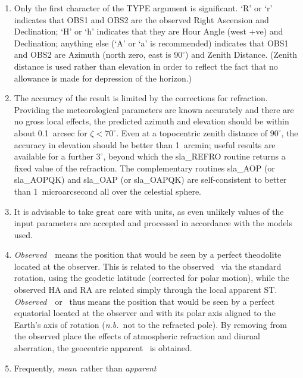 {
 \begin{enumerate}
  \item Only the first character of the TYPE argument is significant.
        `R' or `r' indicates that OBS1 and OBS2 are the observed Right
        Ascension and Declination;  `H' or `h' indicates that they are
        Hour Angle (west +ve) and Declination; anything else (`A' or
        `a' is recommended) indicates that OBS1 and OBS2 are Azimuth
        (north zero, east is $90^{\circ}$) and Zenith Distance.  (Zenith
        distance is used rather than elevation in order to reflect the
        fact that no allowance is made for depression of the horizon.)
  \item The accuracy of the result is limited by the corrections for
        refraction.  Providing the meteorological parameters are
        known accurately and there are no gross local effects, the
        predicted azimuth and elevation should be within about
        0.1~arcsec for $\zeta<70^{\circ}$.  Even
        at a topocentric zenith distance of
        $90^{\circ}$, the accuracy in elevation should be better than
        1~arcmin;  useful results are available for a further
        $3^{\circ}$, beyond which the sla\_REFRO routine returns a
        fixed value of the refraction.  The complementary
        routines sla\_AOP (or sla\_AOPQK) and sla\_OAP (or sla\_OAPQK)
        are self-consistent to better than 1~microarcsecond all over
        the celestial sphere.
  \item It is advisable to take great care with units, as even
        unlikely values of the input parameters are accepted and
        processed in accordance with the models used.
  \item {\it Observed}\, \azel\ means the position that would be seen by a
        perfect theodolite located at the observer.  This is
        related to the observed \hadec\ via the standard rotation, using
        the geodetic latitude (corrected for polar motion), while the
        observed HA and RA are related simply through the local
        apparent ST.  {\it Observed}\, \radec\ or \hadec\ thus means the
        position that would be seen by a perfect equatorial located
        at the observer and with its polar axis aligned to the
        Earth's axis of rotation ({\it n.b.}\ not to the refracted pole).
        By removing from the observed place the effects of
        atmospheric refraction and diurnal aberration, the
        geocentric apparent \radec\ is obtained.
  \item Frequently, {\it mean}\, rather than {\it apparent}\,

\end{enumerate}}
